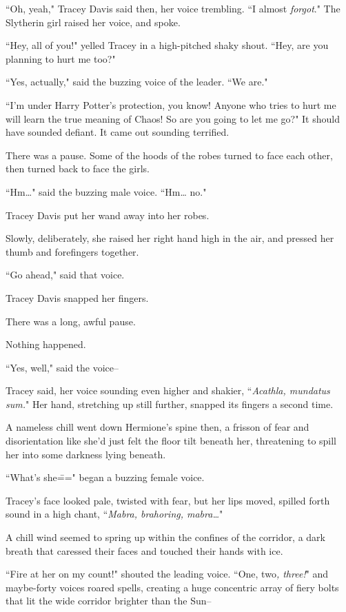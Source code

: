 ``Oh, yeah," Tracey Davis said then, her voice trembling. ``I almost \emph{forgot}." The Slytherin girl raised her voice, and spoke.

``Hey, all of you!" yelled Tracey in a high-pitched shaky shout. ``Hey, are you planning to hurt me too?"

``Yes, actually," said the buzzing voice of the leader. ``We are."

``I'm under Harry Potter's protection, you know! Anyone who tries to hurt me will learn the true meaning of Chaos! So are you going to let me go?" It should have sounded defiant. It came out sounding terrified.

There was a pause. Some of the hoods of the robes turned to face each other, then turned back to face the girls.

``Hm{\ldots}" said the buzzing male voice. ``Hm{\ldots} no."

Tracey Davis put her wand away into her robes.

Slowly, deliberately, she raised her right hand high in the air, and pressed her thumb and forefingers together.

``Go ahead," said that voice.

Tracey Davis snapped her fingers.

There was a long, awful pause.

Nothing happened.

``Yes, well," said the voice\---

Tracey said, her voice sounding even higher and shakier, ``\emph{Acathla, mundatus sum.}" Her hand, stretching up still further, snapped its fingers a second time.

A nameless chill went down Hermione's spine then, a frisson of fear and disorientation like she'd just felt the floor tilt beneath her, threatening to spill her into some darkness lying beneath.

``What's she\===" began a buzzing female voice.

Tracey's face looked pale, twisted with fear, but her lips moved, spilled forth sound in a high chant, ``\emph{Mabra, brahoring, mabra{\ldots}}"

A chill wind seemed to spring up within the confines of the corridor, a dark breath that caressed their faces and touched their hands with ice.

``Fire at her on my count!" shouted the leading voice. ``One, two\emph{, three!}" and maybe-forty voices roared spells, creating a huge concentric array of fiery bolts that lit the wide corridor brighter than the Sun\---

